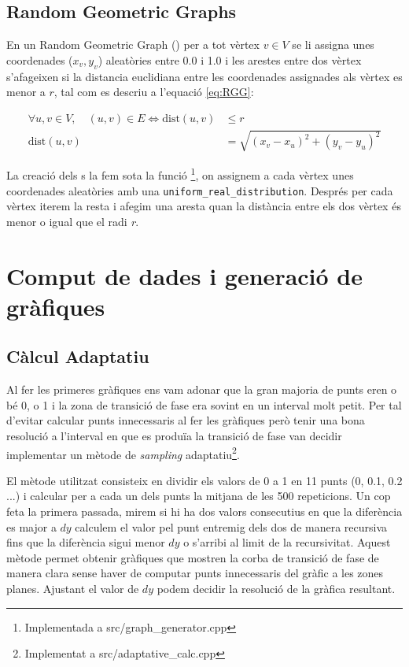 \subsection{Random Geometric Graphs}
En un Random Geometric Graph (\RGG)\cite{Diaz2007On} per a tot vèrtex $v \in V$ se li assigna unes coordenades 
($x_v, y_v$) aleatòries entre 0.0 i 1.0 i les arestes entre dos vèrtex s'afageixen si la distancia euclidiana
entre les coordenades assignades als vèrtex es menor a $r$, tal com es descriu a l'equació \ref{eq:RGG}:

\begin{align} \label{eq:RGG}
    \forall u,v \in V,\quad (u,v) \in E \Longleftrightarrow \text{dist}(u,v) &\leq r \nonumber \\
    \text{dist}(u,v) &= \sqrt{\left(x_v - x_u\right)^2 + \left(y_v - y_u\right)^2}
\end{align}

La creació dels {\RGG}s la fem sota la funció \RGG\footnote{Implementada a src/graph\_generator.cpp}, on assignem a cada vèrtex unes coordenades aleatòries amb una \texttt{uniform\_real\_distribution}\cite{Uniform_real_distributionReference}.
Després per cada vèrtex iterem la resta i afegim una aresta quan la distància entre els dos vèrtex és menor o igual que el radi \textit{r}.

\section{Comput de dades i generació de gràfiques}

\subsection{Càlcul Adaptatiu}

Al fer les primeres gràfiques ens vam adonar que la gran majoria de punts eren o bé 0, o 1 i la zona de transició de fase
era sovint en un interval molt petit. Per tal d'evitar calcular punts innecessaris al fer les gràfiques però tenir una
bona resolució a l'interval en que es produïa la transició de fase van decidir implementar un mètode de \emph{sampling}
adaptatiu\cite{AdaptivePlotting}\footnote{Implementat a src/adaptative\_calc.cpp}.



El mètode utilitzat consisteix en dividir els valors de 0 a 1 en 11 punts (0, 0.1, 0.2 ...) i calcular per a cada un dels
punts la mitjana de les 500 repeticions. Un cop feta la primera passada, mirem si hi ha dos valors consecutius en que la
diferència es major a $dy$ calculem el valor pel punt entremig dels dos de manera recursiva fins que la diferència 
sigui menor $dy$ o s'arribi al limit de la recursivitat. Aquest mètode permet obtenir gràfiques que mostren la corba de
transició de fase de manera clara sense haver de computar punts innecessaris del gràfic a les zones planes. Ajustant el valor de $dy$ podem decidir la resolució de la gràfica resultant.

